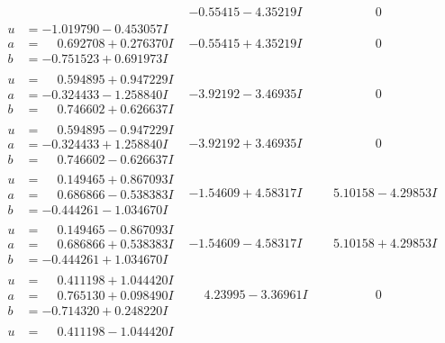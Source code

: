 \documentclass[1p]{elsarticle_modified}
\theoremstyle{definition}
\begin{document}
$$\begin{array}{c|c|c}
 & -0.55415 - 4.35219 I & \phantom{-0.000000 } 0 \\ \hline\begin{aligned}
u &= -1.019790 - 0.453057 I \\
a &= \phantom{-}0.692708 + 0.276370 I \\
b &= -0.751523 + 0.691973 I\end{aligned}
 & -0.55415 + 4.35219 I & \phantom{-0.000000 } 0 \\ \hline\begin{aligned}
u &= \phantom{-}0.594895 + 0.947229 I \\
a &= -0.324433 - 1.258840 I \\
b &= \phantom{-}0.746602 + 0.626637 I\end{aligned}
 & -3.92192 - 3.46935 I & \phantom{-0.000000 } 0 \\ \hline\begin{aligned}
u &= \phantom{-}0.594895 - 0.947229 I \\
a &= -0.324433 + 1.258840 I \\
b &= \phantom{-}0.746602 - 0.626637 I\end{aligned}
 & -3.92192 + 3.46935 I & \phantom{-0.000000 } 0 \\ \hline\begin{aligned}
u &= \phantom{-}0.149465 + 0.867093 I \\
a &= \phantom{-}0.686866 - 0.538383 I \\
b &= -0.444261 - 1.034670 I\end{aligned}
 & -1.54609 + 4.58317 I & \phantom{-}5.10158 - 4.29853 I \\ \hline\begin{aligned}
u &= \phantom{-}0.149465 - 0.867093 I \\
a &= \phantom{-}0.686866 + 0.538383 I \\
b &= -0.444261 + 1.034670 I\end{aligned}
 & -1.54609 - 4.58317 I & \phantom{-}5.10158 + 4.29853 I \\ \hline\begin{aligned}
u &= \phantom{-}0.411198 + 1.044420 I \\
a &= \phantom{-}0.765130 + 0.098490 I \\
b &= -0.714320 + 0.248220 I\end{aligned}
 & \phantom{-}4.23995 - 3.36961 I & \phantom{-0.000000 } 0 \\ \hline\begin{aligned}
u &= \phantom{-}0.411198 - 1.044420 I \\

\end{aligned}
\end{array}$$
\end{document}

